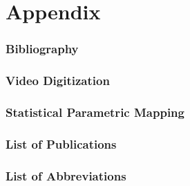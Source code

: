 \documentclass[12pt,a4paper,twoside]{report}
\newcommand\cleartorightpage{%
\clearpage
\hbox{}
}
\begin{document}
\cleartorightpage
\part{Appendix}\label{acknowledgements}


\singlespacing
\section{Bibliography}
\renewcommand{\bibname}{}
\makeatletter
\renewcommand{\chapter}{\@gobbletwo}
\makeatother



\clearpage
\section{Video Digitization}\label{cpt:digitization}


\clearpage
\section{Statistical Parametric Mapping}\label{cpt:spm1d}


\clearpage
\section{List of Publications}\label{cpt:publications}



\clearpage
\section{List of Abbreviations}\label{abbreviations}
\begin{spacing}{1.5}

\end{spacing}
\end{document}
